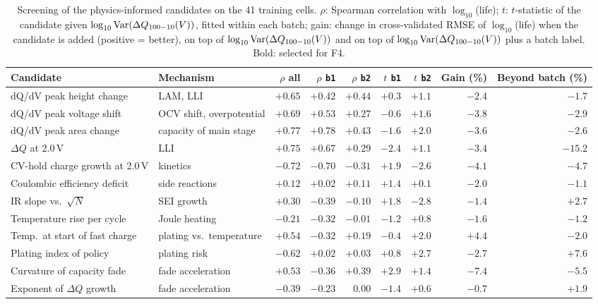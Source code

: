 \begin{table}[t]
\centering
\caption{Screening of the physics-informed candidates on the 41 training
cells. $\rho$: Spearman correlation with $\log_{10}$(life); $t$: $t$-statistic
of the candidate given $\log_{10}\mathrm{Var}(\Delta Q_{100-10}(V))$, fitted within each batch;
gain: change in cross-validated RMSE of $\log_{10}$(life) when the candidate is
added (positive = better), on top of $\log_{10}\mathrm{Var}(\Delta Q_{100-10}(V))$ and on top of
$\log_{10}\mathrm{Var}(\Delta Q_{100-10}(V))$ plus a batch label. Bold: selected for F4.}
\label{tab:screen}
\small
\setlength{\tabcolsep}{3pt}
\begin{tabular}{@{}llrrrrrrr@{}}
\toprule
Candidate & Mechanism & $\rho$ all & $\rho$ \texttt{b1} & $\rho$ \texttt{b2} & $t$ \texttt{b1} & $t$ \texttt{b2} & Gain (\%) & Beyond batch (\%) \\
\midrule
dQ/dV peak height change & LAM, LLI & $+0.65$ & $+0.42$ & $+0.44$ & $+0.3$ & $+1.1$ & $-2.4$ & $-1.7$ \\
dQ/dV peak voltage shift & OCV shift, overpotential & $+0.69$ & $+0.53$ & $+0.27$ & $-0.6$ & $+1.6$ & $-3.8$ & $-2.9$ \\
dQ/dV peak area change & capacity of main stage & $+0.77$ & $+0.78$ & $+0.43$ & $-1.6$ & $+2.0$ & $-3.6$ & $-2.6$ \\
$\Delta Q$ at 2.0\,V & LLI & $+0.75$ & $+0.67$ & $+0.29$ & $-2.4$ & $+1.1$ & $-3.4$ & $-15.2$ \\
CV-hold charge growth at 2.0\,V & kinetics & $-0.72$ & $-0.70$ & $-0.31$ & $+1.9$ & $-2.6$ & $-4.1$ & $-4.7$ \\
Coulombic efficiency deficit & side reactions & $+0.12$ & $+0.02$ & $+0.11$ & $+1.4$ & $+0.1$ & $-2.0$ & $-1.1$ \\
IR slope vs.\ $\sqrt{N}$ & SEI growth & $+0.30$ & $-0.39$ & $-0.10$ & $+1.8$ & $-2.8$ & $-1.4$ & $+2.7$ \\
Temperature rise per cycle & Joule heating & $-0.21$ & $-0.32$ & $-0.01$ & $-1.2$ & $+0.8$ & $-1.6$ & $-1.2$ \\
Temp.\ at start of fast charge & plating vs.\ temperature & $+0.54$ & $-0.32$ & $+0.19$ & $-0.4$ & $+2.0$ & $+4.4$ & $-2.0$ \\
Plating index of policy & plating risk & $-0.62$ & $+0.02$ & $+0.03$ & $+0.8$ & $+2.7$ & $-2.7$ & $+7.6$ \\
Curvature of capacity fade & fade acceleration & $+0.53$ & $-0.36$ & $+0.39$ & $+2.9$ & $+1.4$ & $-7.4$ & $-5.5$ \\
Exponent of $\Delta Q$ growth & fade acceleration & $-0.39$ & $-0.23$ & $0.00$ & $-1.4$ & $+0.6$ & $-0.7$ & $+1.9$ \\

\end{tabular}
\end{table}
